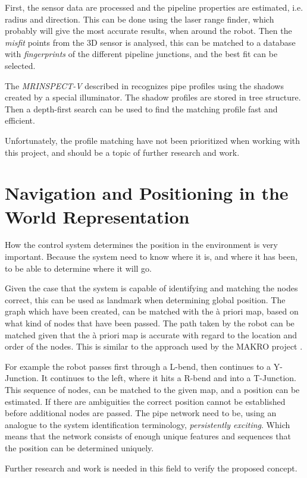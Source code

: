 First, the sensor data are processed and the pipeline properties are estimated, i.e.
radius and direction. This can be done using the laser range finder, which probably will
give the most accurate results, when around the robot. Then the \emph{misfit} points from
the 3D sensor is analysed, this can be matched to a database with \emph{fingerprints} of
the different pipeline junctions, and the best fit can be selected. \cite{theilemann}

The \emph{MRINSPECT-V} described in \cite{MRINSPECT-V} recognizes pipe profiles using the 
shadows created by a special illuminator. The shadow profiles are stored in tree
structure. Then a depth-first search can be used to find the matching profile fast and
efficient. 


Unfortunately, the profile matching have not been prioritized when working with this
project, and should be a topic of further research and work. 


\section{Navigation and Positioning in the World Representation}
How the control system determines the position in the environment is very important.
Because the system need to know where it is, and where it has been, to be
able to determine where it will go. 

Given the case that the system is capable of identifying and matching
the nodes correct, this can be used as landmark when determining global position. The
graph which have been created, can be matched with the \`a priori map, based on what kind
of nodes that have been passed. The path taken by the robot can be matched given that the
\`a priori map is accurate with regard to the location and order of the nodes. This is
similar to the approach used by the MAKRO project \cite{makro-visual}.

For example the robot passes first through a L-bend, then continues to a Y-Junction. It
continues to the left, where it hits a R-bend and into a T-Junction. This sequence of
nodes, can be matched to the given map, and a position can be estimated. If there are
ambiguities the correct position cannot be established before additional nodes are passed.
The pipe network need to be, using an analogue to the system identification terminology, 
\emph{persistently exciting}. Which means that the network consists of enough unique features and
sequences that the position can be determined uniquely. 

Further research and work is needed in this field to verify the proposed concept. 

